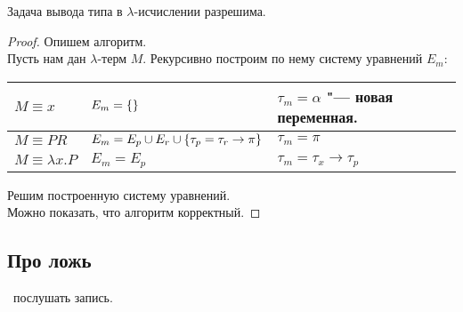 \begin{theorem}
    Задача вывода типа в $\lambda$-исчислении разрешима.
\end{theorem}

\begin{proof}
    Опишем алгоритм. \\
    Пусть нам дан $\lambda$-терм $M$. Рекурсивно построим по нему систему уравнений $E_m$:
    \begin{center}
    \begin{tabular}{l l l} \toprule
        $M \equiv x$ & $E_m=\left\{\right\}$ & $\tau_m=\alpha$ "--- новая переменная. \\ \midrule
        $M \equiv PR$ & $E_m=E_p \cup E_r \cup \left\{\tau_p=\tau_r\rightarrow\pi\right\}$ & $\tau_m=\pi$ \\ \midrule
        $M \equiv \lambda x . P$ & $E_m=E_p$ & $\tau_m=\tau_x\rightarrow\tau_p$ \\ \bottomrule
    \end{tabular}
    \end{center}
    Решим построенную систему уравнений. \\
    Можно показать, что алгоритм корректный.
\end{proof}

\begin{example}
    \todo %
\end{example}

\subsection{\texorpdfstring{Про ложь}{About false}}

\todo\ послушать запись. %
